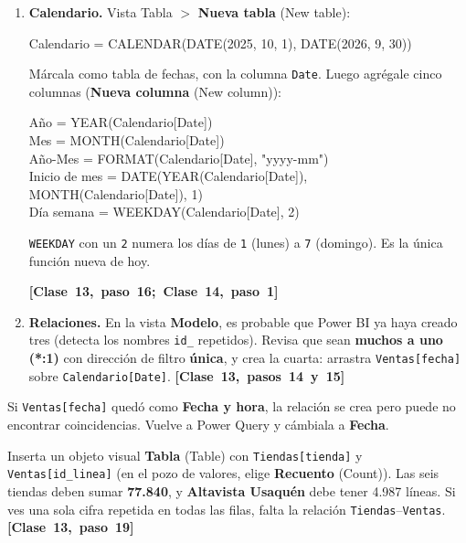 \documentclass[11pt]{article}
\newcommand{\menu}[2]{\textbf{#1} {\color{black!55}(#2)}}
\newcommand{\vez}[1]{\leavevmode\mbox{\color{esumerTeal}\textbf{[#1]}}}
\newcommand{\subtitulo}[1]{\par\needspace{3\baselineskip}\vspace{4pt}{\large\bfseries\color{esumerNavyDark} #1}\par}
\begin{document}
\subtitulo{Paso a paso}

\begin{enumerate}[itemsep=3pt, topsep=2pt]
  \item \textbf{Calendario.} Vista Tabla $>$ \menu{Nueva tabla}{New table}:
\begin{dax}
Calendario = CALENDAR(DATE(2025, 10, 1), DATE(2026, 9, 30))
\end{dax}
    Márcala como tabla de fechas, con la columna \texttt{Date}. Luego agrégale
    cinco columnas (\menu{Nueva columna}{New column}):
\begin{dax}
Año = YEAR(Calendario[Date])\\
Mes = MONTH(Calendario[Date])\\
Año-Mes = FORMAT(Calendario[Date], "yyyy-mm")\\
Inicio de mes = DATE(YEAR(Calendario[Date]), MONTH(Calendario[Date]), 1)\\
Día semana = WEEKDAY(Calendario[Date], 2)
\end{dax}
    \footnotesize \texttt{WEEKDAY} con un \texttt{2} numera los días de
    \texttt{1} (lunes) a \texttt{7} (domingo). Es la única función nueva de
    hoy.\par\normalsize\hfill\vez{Clase 13, paso 16; Clase 14, paso 1}
  \item \textbf{Relaciones.} En la vista \textbf{Modelo}, es probable que Power BI
    ya haya creado tres (detecta los nombres \texttt{id\_} repetidos). Revisa que sean
    \textbf{muchos a uno (*:1)} con dirección de filtro \textbf{única}, y
    crea la cuarta: arrastra \texttt{Ventas[fecha]} sobre
    \texttt{Calendario[Date]}. \hfill \vez{Clase 13, pasos 14 y 15}
\end{enumerate}

\begin{cuidado}
\small Si \texttt{Ventas[fecha]} quedó como \textbf{Fecha y hora}, la
relación se crea pero puede no encontrar coincidencias. Vuelve a Power Query
y cámbiala a \textbf{Fecha}.
\end{cuidado}

\begin{control}
\small Inserta un objeto visual \menu{Tabla}{Table} con
\texttt{Tiendas[tienda]} y \texttt{Ventas[id\_linea]} (en el pozo de
valores, elige \menu{Recuento}{Count}). Las seis tiendas deben sumar
\textbf{77.840}, y \textbf{Altavista Usaquén} debe tener 4.987 líneas. Si
ves una sola cifra repetida en todas las filas, falta la relación
\texttt{Tiendas}--\texttt{Ventas}. \vez{Clase 13, paso 19}
\end{control}
\end{document}

